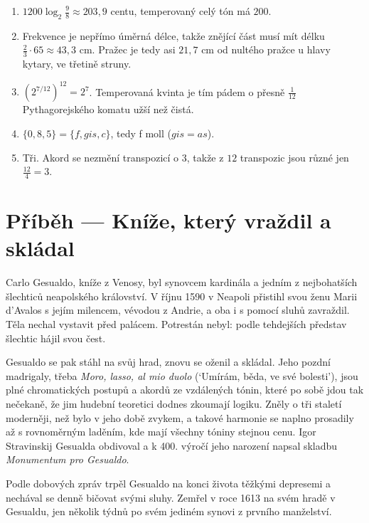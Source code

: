 \begin{solution}
  \begin{enumerate}[label=(\alph*)]
    \item $1200\log_2\frac{9}{8}\approx 203{,}9$ centu, temperovaný celý tón má $200$.
    \item Frekvence je nepřímo úměrná délce, takže znějící část musí mít délku $\frac{2}{3}\cdot 65\approx 43{,}3$ cm. Pražec je tedy asi $21{,}7$ cm od nultého pražce u hlavy kytary, ve třetině struny.
    \item ${\left(2^{7/12}\right)}^{12} = 2^7$. Temperovaná kvinta je tím pádem o přesně $\frac{1}{12}$ Pythagorejského komatu užší než čistá.
    \item $\{0, 8, 5\} = \{f, gis, c\}$, tedy f moll ($gis = as$).
    \item Tři. Akord se nezmění transpozicí o $3$, takže z $12$ transpozic jsou různé jen $\frac{12}{4} = 3$.
  \end{enumerate}
\end{solution}

\section{Příběh --- Kníže, který vraždil a skládal}

Carlo Gesualdo, kníže z Venosy, byl synovcem kardinála a jedním z nejbohatších šlechticů neapolského království. V říjnu 1590 v Neapoli přistihl svou ženu Marii d'Avalos s jejím milencem, vévodou z Andrie, a oba i s pomocí sluhů zavraždil. Těla nechal vystavit před palácem. Potrestán nebyl: podle tehdejších představ šlechtic hájil svou čest.

Gesualdo se pak stáhl na svůj hrad, znovu se oženil a skládal. Jeho pozdní madrigaly, třeba \textit{Moro, lasso, al mio duolo} (`Umírám, běda, ve své bolesti'), jsou plné chromatických postupů a akordů ze vzdálených tónin, které po sobě jdou tak nečekaně, že jim hudební teoretici dodnes zkoumají logiku. Zněly o tři staletí moderněji, než bylo v jeho době zvykem, a takové harmonie se naplno prosadily až s rovnoměrným laděním, kde mají všechny tóniny stejnou cenu. Igor Stravinskij Gesualda obdivoval a k 400. výročí jeho narození napsal skladbu \textit{Monumentum pro Gesualdo}.

Podle dobových zpráv trpěl Gesualdo na konci života těžkými depresemi a nechával se denně bičovat svými sluhy. Zemřel v roce 1613 na svém hradě v Gesualdu, jen několik týdnů po svém jediném synovi z prvního manželství.

